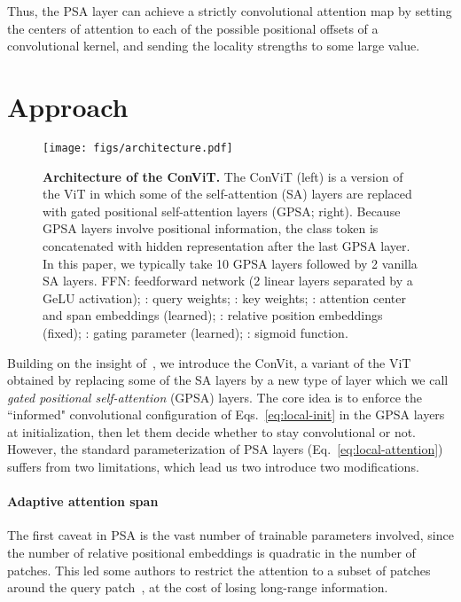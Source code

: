 \documentclass[a4paper,11pt,twocolumn]{article}
\begin{document}
Thus, the PSA layer can achieve a strictly convolutional attention map by setting the centers of attention  to each of the possible positional offsets of a  convolutional kernel, and sending the locality strengths  to some large value. 


\section{Approach}

\begin{figure}[tb]
    \centering
    \texttt{[image: figs/architecture.pdf]}
    \caption{\textbf{Architecture of the ConViT.} The ConViT (left) is a version of the ViT in which some of the self-attention (SA) layers are replaced with gated positional self-attention layers (GPSA; right). Because GPSA layers involve positional information, the class token is concatenated with hidden representation after the last GPSA layer. In this paper, we typically take 10 GPSA layers followed by 2 vanilla SA layers. FFN: feedforward network (2 linear layers separated by a GeLU activation); : query weights; : key weights; : attention center and span embeddings (learned); : relative position embeddings (fixed); : gating parameter (learned); : sigmoid function.}
    \label{fig:architecture}
\end{figure}

Building on the insight of~\cite{cordonnier2019relationship}, we introduce the ConVit, a variant of the ViT~\cite{dosovitskiy2020image} obtained by replacing some of the SA layers by a new type of layer which we call \emph{gated positional self-attention} (GPSA) layers. The core idea is to enforce the ``informed" convolutional configuration of Eqs.~\ref{eq:local-init} in the GPSA layers at initialization, then let them decide whether to stay convolutional or not. However, the standard parameterization of PSA layers (Eq.~\ref{eq:local-attention}) suffers from two limitations, which lead us two introduce two modifications.

\paragraph{Adaptive attention span} The first caveat in PSA is the vast number of trainable parameters involved, since the number of relative positional embeddings  is quadratic in the number of patches. This led some authors to restrict the attention to a subset of patches around the query patch~\cite{ramachandran2019stand}, at the cost of losing long-range information. 
\end{document}

